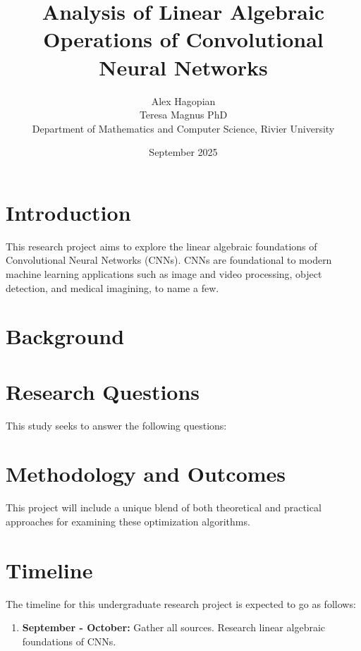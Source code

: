 \documentclass[12pt]{article}
\title{Analysis of Linear Algebraic Operations of Convolutional Neural Networks}
\author{Alex Hagopian \\Teresa Magnus PhD \\ Department of Mathematics and Computer Science, Rivier University}
\date{September 2025}
\begin{document}
\maketitle

\begin{abstract}

\end{abstract}
\section*{Introduction}
This research project aims to explore the linear algebraic 
foundations of Convolutional Neural Networks (CNNs). CNNs are foundational 
to modern machine learning applications such as image and video processing,
object detection, and medical imagining, to name a few.

\section*{Background}


\section*{Research Questions}
This study seeks to answer the following questions: 

\section*{Methodology and Outcomes}
This project will include a unique blend of 
both theoretical and practical approaches for examining 
these optimization algorithms. 


\section*{Timeline}
The timeline for this undergraduate research project 
is expected to go as follows:
\begin{enumerate}
    \item \textbf{September - October:} Gather all sources. Research linear algebraic
    foundations of CNNs. 
\end{enumerate}

%  
% 
\end{document}
